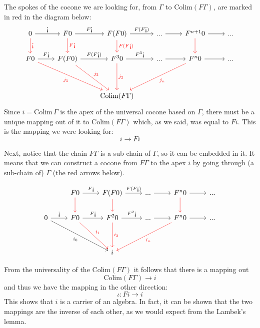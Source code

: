 \documentclass[DaoFP]{subfiles}
\begin{document}
The spokes of the cocone we are looking for, from $\Gamma$ to $\text{Colim} (F \Gamma)$, are marked in red in the diagram below:
\[
 \begin{tikzcd}
 0
 \arrow[r, "\mbox{!`}"]
 \arrow[d, red, "\mbox{!`}"]
 & F 0
  \arrow[r, "F\mbox{!`}"]
  \arrow[d, red, "F\mbox{!`}"]
& F (F 0)
  \arrow[r, "F(F\mbox{!`})"]
  \arrow[d, red, "F(F\mbox{!`})"]
 & ...
 \arrow[r]
 & F^{n+1} 0
  \arrow[r]
  \arrow[d, red]
 & ...
 \\
 F 0
 \arrow[r, "F \mbox{!`}"]
 \arrow[ddrr, red, "j_1"']
 &  F (F 0)
  \arrow[r, "F(F  \mbox{!`})"]
 \arrow[ddr, red, "j_2"]
& F^3 0
  \arrow[r, "F^3\mbox{!`}"]
  \arrow[dd, red, "j_3"]
 & ...
 \arrow[r]
 & F^n 0
  \arrow[r]
 \arrow[ddll, red, "j_n"]
 & ...
 \\
 \\
 &&\text{Colim} (F \Gamma)
  \end{tikzcd}
\]
Since $i = \text{Colim}\, \Gamma$ is the apex of the universal cocone based on $\Gamma$, there must be a unique mapping out of it to $\text{Colim} (F \Gamma)$ which, as we said, was equal to $F i$. This is the mapping we were looking for:
\[ i \to F i \]

Next, notice that the chain $F \Gamma$ is a sub-chain of $\Gamma$, so it can be embedded in it. It means that we can construct a cocone from $F \Gamma$ to the apex $i$ by going through (a sub-chain of) $\Gamma$ (the red arrows below). 

\[
 \begin{tikzcd}
 & F 0
  \arrow[r, "F\mbox{!`}"]
  \arrow[d, red]
& F (F 0)
  \arrow[r, "F(F\mbox{!`})"]
  \arrow[d, red]
 & ...
 \arrow[r]
 & F^{n} 0
  \arrow[r]
  \arrow[d, red]
 & ...
 \\
  0
 \arrow[r, "\mbox{!`}"]
 \arrow[ddrr,  "i_0"']
 &  F 0
  \arrow[r, "F  \mbox{!`}"]
 \arrow[ddr, red, "i_1"]
& F^2 0
  \arrow[r, "F^2\mbox{!`}"]
  \arrow[dd, red, "i_2"]
 & ...
 \arrow[r]
 & F^n 0
  \arrow[r]
 \arrow[ddll, red, "i_n"]
 & ...
 \\
 \\
 &&i
  \end{tikzcd}
\]


From the universality of the $\text{Colim} (F \Gamma)$ it follows that there is a mapping out 
\[\text{Colim} (F \Gamma) \to i \]
and thus we have the mapping in the other direction:
\[ \iota \colon F i \to i \]
This shows that $i$ is a carrier of an algebra. In fact, it can be shown that the two mappings are the inverse of each other, as we would expect from the Lambek's lemma.
\end{document}

